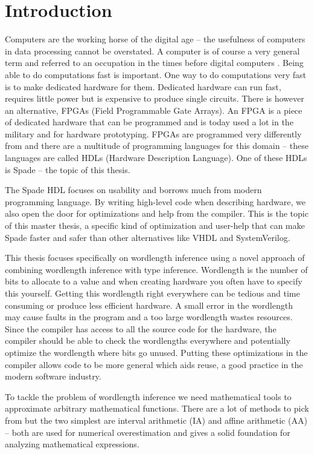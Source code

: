 \chapter{Introduction}
\label{chaIntro}
Computers are the working horse of the digital age -- the usefulness of computers in data processing cannot be overstated. A computer is of course a very general term and referred to an occupation in the times before digital computers \cite{src:ComputerOccupation}. Being able to do computations fast is important. One way to do computations very fast is to make dedicated hardware for them. Dedicated hardware can run fast, requires little power but is expensive to produce single circuits. There is however an alternative, FPGAs (Field Programmable Gate Arrays). An FPGA is a piece of dedicated hardware that can be programmed and is today used a lot in the military and for hardware prototyping. FPGAs are programmed very differently from  and there are a multitude of programming languages for this domain -- these languages are called HDLs (Hardware Description Language). One of these HDLs is Spade -- the topic of this thesis.

The Spade HDL focuses on usability and borrows much from modern programming language\cite{src:spadeSomething, src:spadeAnHDL}. By writing high-level code when describing hardware, we also open the door for optimizations and help from the compiler. This is the topic of this master thesis, a specific kind of optimization and user-help that can make Spade faster and safer than other alternatives like VHDL and SystemVerilog.

This thesis focuses specifically on wordlength inference using a novel approach of combining wordlength inference with type inference. Wordlength is the number of bits to allocate to a value and when creating hardware you often have to specify this yourself. Getting this wordlength right everywhere can be tedious and time consuming or produce less efficient hardware. A small error in the wordlength may cause faults in the program and a too large wordlength wastes resources.
Since the compiler has access to all the source code for the hardware, the compiler should be able to check the wordlengths everywhere and potentially optimize the wordlength where bits go unused. Putting these optimizations in the compiler allows code to be more general which aids reuse, a good practice in the modern software industry. 

To tackle the problem of wordlength inference we need mathematical tools to approximate arbitrary mathematical functions. There are a lot of methods to pick from but the two simplest are interval arithmetic (IA)\cite{src:affAri} and affine arithmetic (AA)\cite{src:affAri} -- both are used for numerical overestimation and gives a solid foundation for analyzing mathematical expressions.

